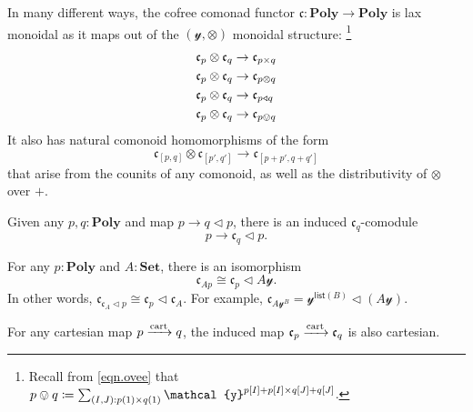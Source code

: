 \documentclass[11pt, one side, article]{memoir}
\theoremstyle{definition}
\theoremstyle{plain}
\newcommand{\Cat}[1]{\mathbf{#1}}%
\newcommand{\Fun}[1]{\mathsf{#1}}%
\newcommand{\To}[2][]{\xrightarrow[#1]{\tn{$#2$}}}
\newcommand{\tn}[1]{\textnormal{#1}}
\newcommand{\smset}{\Cat{Set}}
\newcommand{\List}{\Fun{list}}
\newcommand{\yon}{{\mathcal{y}}}
\newcommand{\poly}{\Cat{Poly}}
\newcommand{\cart}{\tn{cart}}
\newcommand{\tocart}{\To{\cart}}
\newcommand{\0}{\textsf{0}}
\newcommand{\1}{\tn{\textsf{1}}}
\newcommand{\tri}{\mathbin{\triangleleft}}
\newcommand{\cofree}{\mathfrak{c}}
\begin{document}
 
In many different ways, the cofree comonad functor $\cofree\colon\poly\to\poly$ is lax monoidal as it maps out of the $(\yon,\otimes)$ monoidal structure:%
\footnote{Recall from \eqref{eqn.ovee} that $p\ovee q\coloneqq \sum_{(I,J): p(1)\times q(1)}\yon^{p[I]+p[I]\times q[J]+q[J]}$.}
\begin{align}
  \cofree_p\otimes\cofree_q&\to\cofree_{p\times q}\\
  \label{cofree_lax_monoidal}
  \cofree_p\otimes\cofree_q&\to\cofree_{p\otimes q}\\
  \cofree_p\otimes\cofree_q&\to\cofree_{p\tri q}\\
	\cofree_p\otimes\cofree_q&\to\cofree_{p\ovee q}  
\end{align}
It also has natural comonoid homomorphisms of the form
\begin{equation}
	\cofree_{[p,q]}\otimes\cofree_{[p',q']}\to\cofree_{[p+p',q+q']}
\end{equation}
that arise from the counits of any comonoid, as well as the distributivity of $\otimes$ over $+$.

Given any $p,q:\poly$ and map $p\to q\tri p$, there is an induced $\cofree_q$-comodule
\begin{equation}\label{eqn.induced_comodule}
p\to\cofree_q\tri p.
\end{equation}


For any $p:\poly$ and $A:\smset$, there is an isomorphism
\begin{equation}
	\cofree_{Ap}
	\cong
	\cofree_p\tri A\yon.
\end{equation}
In other words, $\cofree_{\cofree_A\tri p}\cong\cofree_p\tri\cofree_A$. For example, $\cofree_{A\yon^B}=\yon^{\List(B)}\tri(A\yon)$.


For any cartesian map $p\tocart q$, the induced map $\cofree_p\tocart\cofree_q$ is also cartesian.

\end{document}
